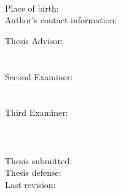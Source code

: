 \thispagestyle{empty}

\begin{flushleft}
\textcolor{myorange}{
	\underline{\textcolor{black}{\textbf{\Author}}}
}\\
Place of birth: \AuthorPlaceofBirth\\
Author's contact information:\\
\href{mailto:\AuthorMail}{\texttt{\AuthorMail}}
\end{flushleft}
\mbox{}
\vfill

\begin{minipage}[t]{0.28\textwidth}
Thesis Advisor:\\\\\\
Second Examiner:\\\\\\
Third Examiner:\\\\\\\\
Thesis submitted:\\
Thesis defense:\\
Last revision:\\
\end{minipage}
\begin{minipage}[t]{0.8\textwidth}
\textbf{\Supervisor}\\
\SupervisorInstitution\\
\textbf{\SecondSupervisor}\\
\SecondSupervisorInstitution\\
\textbf{\ThirdSupervisor}\\
\ThirdSupervisorInstitution\\
\SubmissionDate\\
\DefenseDate\\
\LatestRevisionDate\\
\end{minipage}